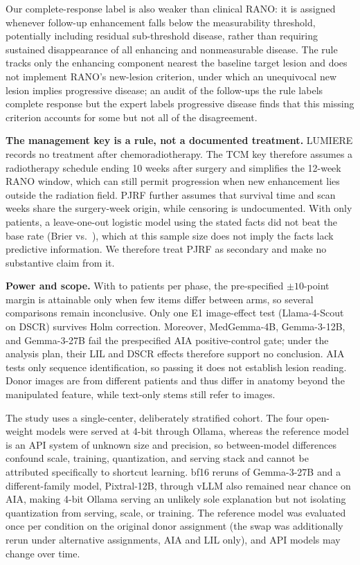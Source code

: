 \documentclass[conference]{IEEEtran}
\begin{document}
Our complete-response label is also weaker than clinical RANO: it is assigned whenever follow-up enhancement falls below the measurability threshold, potentially including residual sub-threshold disease, rather than requiring sustained disappearance of all enhancing and nonmeasurable disease. The rule tracks only the enhancing component nearest the baseline target lesion and does not implement RANO's new-lesion criterion, under which an unequivocal new lesion implies progressive disease; an audit of the follow-ups the rule labels complete response but the expert labels progressive disease finds that this missing criterion accounts for some but not all of the disagreement.

\textbf{The management key is a rule, not a documented treatment.} LUMIERE records no treatment after chemoradiotherapy. The TCM key therefore assumes a radiotherapy schedule ending 10 weeks after surgery and simplifies the 12-week RANO window, which can still permit progression when new enhancement lies outside the radiation field. PJRF further assumes that survival time and scan weeks share the surgery-week origin, while censoring is undocumented. With only \vfourPjrfN{} patients, a leave-one-out logistic model using the stated facts did not beat the base rate (Brier \vfourPjrfBrierLR{} vs.\ \vfourPjrfBrierBase{}), which at this sample size does not imply the facts lack predictive information. We therefore treat PJRF as secondary and make no substantive claim from it.

\textbf{Power and scope.} With \vfourNLIL{} to \vfourNAIA{} patients per phase, the pre-specified $\pm10$-point margin is attainable only when few items differ between arms, so several comparisons remain inconclusive. Only one E1 image-effect test (Llama-4-Scout on DSCR) survives Holm correction. Moreover, MedGemma-4B, Gemma-3-12B, and Gemma-3-27B fail the prespecified AIA positive-control gate; under the analysis plan, their LIL and DSCR effects therefore support no conclusion. AIA tests only sequence identification, so passing it does not establish lesion reading. Donor images are from different patients and thus differ in anatomy beyond the manipulated feature, while text-only stems still refer to images.

The study uses a single-center, deliberately stratified cohort. The four open-weight models were served at 4-bit through Ollama, whereas the reference model is an API system of unknown size and precision, so between-model differences confound scale, training, quantization, and serving stack and cannot be attributed specifically to shortcut learning. bf16 reruns of Gemma-3-27B and a different-family model, Pixtral-12B, through vLLM also remained near chance on AIA, making 4-bit Ollama serving an unlikely sole explanation but not isolating quantization from serving, scale, or training. The reference model was evaluated once per condition on the original donor assignment (the swap was additionally rerun under alternative assignments, AIA and LIL only), and API models may change over time.
\end{document}
